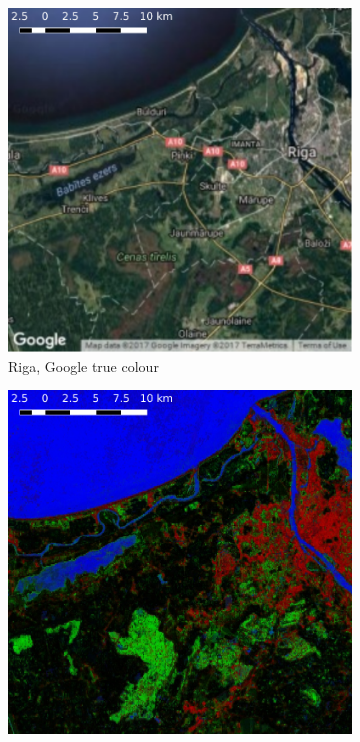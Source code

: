 \documentclass[a4paper,12pt]{scrbook}
\begin{document}
\begin{figure}
  \ContinuedFloat
  \centering
  \begin{subfigure}[t]{.23\textwidth}
    \includegraphics[width=\textwidth]{thesis-figures/figures-qgis/riga-google}
    \caption{Riga, Google true colour}
  \end{subfigure} \hfill
  \begin{subfigure}[t]{.23\textwidth}
    \includegraphics[width=\textwidth]{thesis-figures/figures-qgis/riga-rf}

\end{subfigure}
\end{figure}
\end{document}
